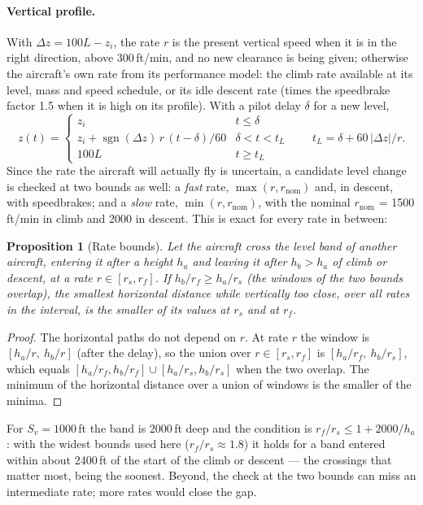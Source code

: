 \documentclass[11pt,a4paper]{article}
\newtheorem{proposition}{Proposition}
\newcommand{\Sv}{S_v}
\begin{document}
\paragraph{Vertical profile.} With $\Delta z = 100L - z_i$, the rate $r$ is the present vertical speed when it is
in the right direction, above 300\,ft/min, and no new clearance is being given; otherwise the aircraft's own rate
from its performance model: the climb rate available at its level, mass and speed schedule, or its idle descent
rate (times the speedbrake factor 1.5 when it is high on its profile). With a pilot delay $\delta$ for a new level,
\begin{equation}
z(t) = \begin{cases} z_i & t \le \delta\\ z_i + \operatorname{sgn}(\Delta z)\, r\,(t-\delta)/60 & \delta < t < t_L\\ 100L & t\ge t_L\end{cases}
\qquad t_L = \delta + 60\,|\Delta z|/r .
\end{equation}
Since the rate the aircraft will actually fly is uncertain, a candidate level change is checked at two bounds as
well: a \emph{fast} rate, $\max(r, r_{\mathrm{nom}})$ and, in descent, with speedbrakes; and a \emph{slow} rate,
$\min(r, r_{\mathrm{nom}})$, with the nominal $r_{\mathrm{nom}}$ = 1500\,ft/min in climb and 2000 in descent. This is
exact for every rate in between:

\begin{proposition}[Rate bounds]\label{prop:rates}
Let the aircraft cross the level band of another aircraft, entering it after a height $h_a$ and leaving it after
$h_b>h_a$ of climb or descent, at a rate $r\in[r_s,r_f]$. If $h_b/r_f \ge h_a/r_s$ (the windows of the two bounds
overlap), the smallest horizontal distance while vertically too close, over all rates in the interval, is the
smaller of its values at $r_s$ and at $r_f$.
\end{proposition}
\begin{proof}
The horizontal paths do not depend on $r$. At rate $r$ the window is $[h_a/r,\ h_b/r]$ (after the delay), so the union
over $r\in[r_s,r_f]$ is $[h_a/r_f,\ h_b/r_s]$, which equals $[h_a/r_f, h_b/r_f]\cup[h_a/r_s, h_b/r_s]$ when the two
overlap. The minimum of the horizontal distance over a union of windows is the smaller of the minima.
\end{proof}

\noindent For $\Sv = 1000$\,ft the band is 2000\,ft deep and the condition is $r_f/r_s \le 1 + 2000/h_a$: with the
widest bounds used here ($r_f/r_s\approx1.8$) it holds for a band entered within about 2400\,ft of the start of the
climb or descent --- the crossings that matter most, being the soonest. Beyond, the check at the two bounds can miss
an intermediate rate; more rates would close the gap.
\end{document}
